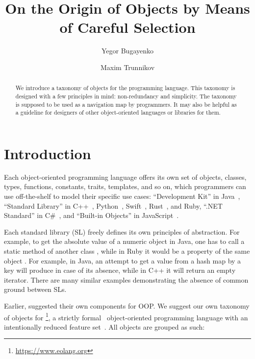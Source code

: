 \documentclass[sigplan,nonacm]{acmart}
\title{On the Origin of Objects by Means of Careful Selection}
\author{Yegor Bugayenko}
\affiliation{
  \institution{Huawei}
  \country{Russia}
  \city{Moscow}
}
\author{Maxim Trunnikov}
\affiliation{
  \institution{Huawei}
  \country{Russia}
  \city{Moscow}
}
\begin{document}
\begin{abstract}
We introduce a taxonomy of objects for the \eolang{} programming language.
This taxonomy is designed with a few principles in mind: non-redundancy and simplicity.
The taxonomy is supposed to be used as a navigation map by \eolang{} programmers.
It may also be helpful as a guideline for designers of other object-oriented languages or libraries for them.
\end{abstract}

\maketitle

\section{Introduction}

Each object-oriented programming language offers its own set of objects, classes, types, functions, constants, traits, templates, and so on, which programmers can use off-the-shelf to model their specific use cases:
``Development Kit'' in Java~\citep{jdk2024,jdk8},
``Standard Library'' in
  C++~\citep{cpp2024,josuttis2012cpp},
  Python~\citep{python2024,hellmann2017python},
  Swift~\citep{swift2024,deitel2015swift},
  Rust~\citep{rust2024,blandy2021rust},
  and
  Ruby,
``.NET Standard'' in C\#~\citep{net2023,abrams2005net},
and ``Built-in Objects'' in JavaScript~\citep{js2024,crockford2008js}.

Each standard library (SL) freely defines its own principles of abstraction.
For example, to get the absolute value of a numeric object  in Java, one has to call a static method of another class , while in Ruby it would be a property of the same object .
For example, in Java, an attempt to get a value from a hash map by a key will produce  in case of its absence, while in C++ it will return an empty iterator.
There are many similar examples demonstrating the absence of common ground between SLs.

Earlier, \citet{booch1990design} suggested their own components for OOP.
We suggest our own taxonomy of objects for \eolang{}\footnote{\url{https://www.eolang.org}}, a strictly formal~\citep{kudasov2022formalizing} object-oriented programming language with an intentionally reduced feature set~\citep{bugayenko2021eolang}.
All objects are grouped as such:
\end{document}
